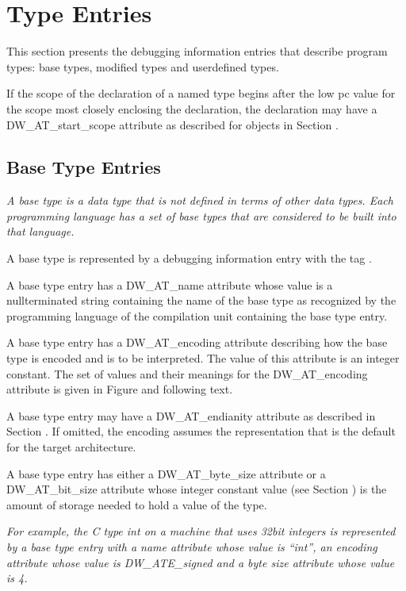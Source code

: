 \chapter{Type Entries}
\label{chap:typeentries}
This section presents the debugging information entries
that describe program types: base types, modified types and
user\dash defined types.

If the scope of the declaration of a named type begins after
the low pc value for the scope most closely enclosing the
declaration, the declaration may have a DW\_AT\_start\_scope
attribute as described for objects in 
Section .

\section{Base Type Entries}
\label{chap:basetypeentries}

\textit{A base type is a data type that is not defined in terms of
other data types. Each programming language has a set of base
types that are considered to be built into that language.}

A base type is represented by a debugging information entry
with the tag 
.

A base type entry has a DW\_AT\_name attribute whose value is
a null\dash terminated string containing the name of the base type
as recognized by the programming language of the compilation
unit containing the base type entry.

A base type entry has a DW\_AT\_encoding attribute describing
how the base type is encoded and is to be interpreted. The
value of this attribute is an integer constant. The set of
values and their meanings for the DW\_AT\_encoding attribute
is given in 
Figure 
and following text.  

A base type entry
may have a DW\_AT\_endianity attribute as described in 
Section . 
If omitted, the encoding assumes the representation that
is the default for the target architecture.

A base type entry has either a DW\_AT\_byte\_size attribute
or a DW\_AT\_bit\_size attribute whose integer constant value
(see Section ) 
is the amount of storage needed to hold
a value of the type.

\textit{For example, the C type int on a machine that uses 32\dash bit
integers is represented by a base type entry with a name
attribute whose value is “int”, an encoding attribute
whose value is DW\_ATE\_signed and a byte size attribute whose
value is 4.}

